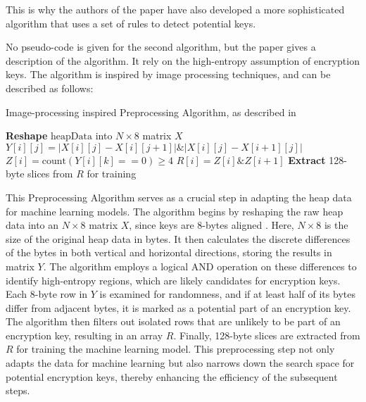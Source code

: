    This is why the authors of the paper have also developed a more sophisticated algorithm that uses a set of rules to detect potential keys.

    No pseudo-code is given for the second algorithm, but the paper  gives a description of the algorithm. It rely on the high-entropy assumption of encryption keys. The algorithm is inspired by image processing techniques, and can be described as follows:

    \begin{algorithm}
        \caption{Image-processing inspired Preprocessing Algorithm, as described in  \cite{SmartKex22}}
        \begin{algorithmic}[1]
            \State \textbf{Reshape} $\text{heapData}$ into $N \times 8$ matrix $X$
                    \State $Y[i][j] = |X[i][j] - X[i][j+1]| \& |X[i][j] - X[i+1][j]|$
                    \State $Z[i] = \text{count}(Y[i][k] == 0) \geq 4$
                        \State $R[i] = Z[i] \& Z[i+1]$
                    \EndIf
                \EndFor
            \EndFor
            \State \textbf{Extract} 128-byte slices from $R$ for training
        \EndProcedure
        \end{algorithmic}
    \end{algorithm}
    
    This Preprocessing Algorithm serves as a crucial step in adapting the heap data for machine learning models. The algorithm begins by reshaping the raw heap data into an \(N \times 8\) matrix \(X\), since keys are 8-bytes aligned \cite{SmartKex22}. Here, \(N \times 8\) is the size of the original heap data in bytes. It then calculates the discrete differences of the bytes in both vertical and horizontal directions, storing the results in matrix \(Y\). The algorithm employs a logical AND operation on these differences to identify high-entropy regions, which are likely candidates for encryption keys. Each 8-byte row in \(Y\) is examined for randomness, and if at least half of its bytes differ from adjacent bytes, it is marked as a potential part of an encryption key. The algorithm then filters out isolated rows that are unlikely to be part of an encryption key, resulting in an array \(R\). Finally, 128-byte slices are extracted from \(R\) for training the machine learning model. This preprocessing step not only adapts the data for machine learning but also narrows down the search space for potential encryption keys, thereby enhancing the efficiency of the subsequent steps. 

